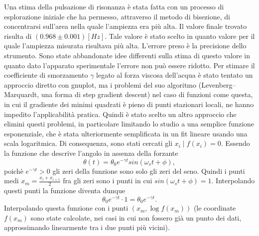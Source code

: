 Una stima della pulsazione di risonanza è stata fatta con un processo di esplorazione iniziale che ha permesso, attraverso
il metodo di bisezione, di concentrarsi sull'area nella quale l'ampiezza era più alta. Il valore finale trovato risulta di $(0.968 \pm 0.001) [Hz]$.
 Tale valore è stato scelto in quanto valore per il quale l'ampiezza misurata risultava più alta. L'errore preso è la precisione dello
 strumento. Sono state abbandonate idee differenti sulla stima di questo valore in quanto dato l'apparato sperimentale l'errore non
 può essere ridotto.
Per stimare il coefficiente di smorzamento $\gamma$ legato al forza viscosa dell'acqua è stato tentato un approccio diretto con gnuplot, 
ma i problemi del suo algoritmo (Levenberg–Marquardt, una forma di step gradient descent) nel caso di funzioni come questa, in cui il gradiente 
dei minimi quadrati è pieno di punti 
stazionari locali, ne hanno impedito l'applicabilità pratica. Quindi è stato scelto un altro approccio che elimini questi problemi, in particolare limitando lo
studio a una semplice funzione esponenziale, che è stata ulteriormente semplificata in un fit lineare usando una scala logaritmica.
Di consequenza, sono stati cercati gli $x_i \mid f(x_i)=0$. Essendo la funzione che descrive l'angolo in assenza della forzante
\begin{equation}
	\theta(t) = \theta_0 e^{-\gamma t} sin(\omega_s t + \phi),
\end{equation}
poichè $e^{-\gamma t} > 0$ gli zeri della funzione sono solo gli zeri del seno. Quindi i punti medi 
$x_m = \frac{x_i + x_{i+1}}{2}$ fra gli zeri sono i punti in cui $sin(\omega_s t + \phi) = 1$.
Interpolando questi punti la funzione diventa dunque
\[
	\theta_0 e^{-\gamma t} \cdot 1 = \theta_0 e^{-\gamma t}.
\]
Interpolando questa funzione con i punti $(x_m,\log{f(x_m)})$ (le coordinate $f(x_m)$ sono state calcolate, nei casi in cui non fossero già un punto dei dati,
approssimando linearmente tra i due punti più vicini).


